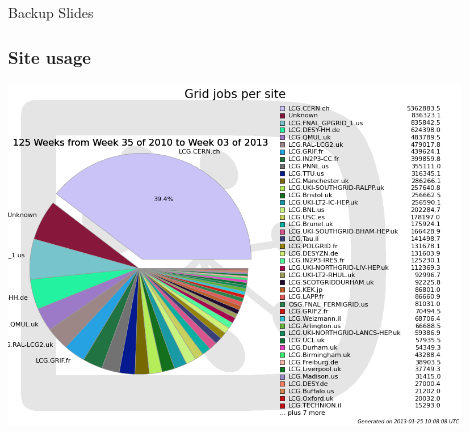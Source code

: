 \documentclass[10pt,table,dvipsnames]{beamer}
\newcommand{\interstitial}[1]{\begin{frame}\begin{block}{}\centering\Huge{#1}\end{block} \end{frame}}
\newcommand{\backupslides}{\interstitial{Backup Slides}}
\begin{document}
\backupslides

\begin{frame}
  \frametitle{Site usage}
\centering
\includegraphics[width=0.9\textwidth]{PilotsPerSite}\\
\end{frame}
\end{document}
